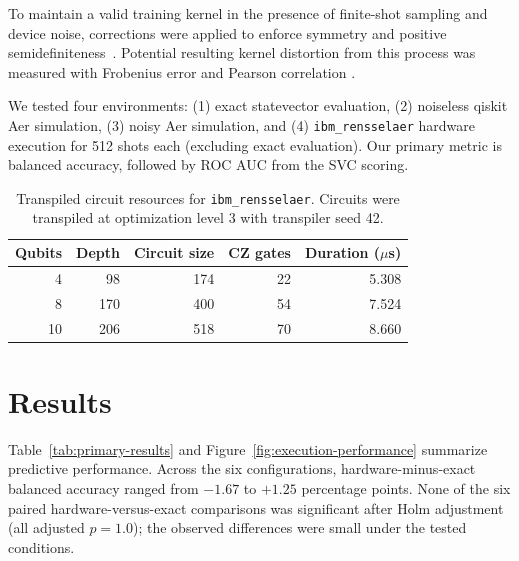 \documentclass[letterpaper]{article} %
\begin{document}
To maintain a valid training kernel in the presence of finite-shot sampling and device noise, corrections were applied to enforce symmetry and positive semidefiniteness~\cite{scholkopf2002,qiskit2024}.
Potential resulting kernel distortion from this process was measured with Frobenius error and Pearson correlation \cite{Frob, Pear}.

We tested four environments: (1) exact statevector evaluation, (2) noiseless qiskit Aer simulation, (3) noisy Aer simulation, and (4) \texttt{ibm\_rensselaer} hardware execution for 512 shots each (excluding exact evaluation). Our primary metric is balanced accuracy, followed by ROC AUC from the SVC scoring.



\begin{table}[t]
  \centering
  \small
  \caption{Transpiled circuit resources for \texttt{ibm\_rensselaer}.
  Circuits were transpiled at optimization level 3 with transpiler
  seed 42.}
  \label{tab:circuit-resources}
  \begin{tabular}{rrrrr}
  \toprule
  Qubits & Depth & Circuit size & CZ gates & Duration ($\mu$s) \\
  \midrule
  4  & 98  & 174 & 22 & 5.308 \\
  8  & 170 & 400 & 54 & 7.524 \\
  10 & 206 & 518 & 70 & 8.660 \\
  \bottomrule
  \end{tabular}
  \end{table}


\section{Results}

Table~\ref{tab:primary-results} and Figure~\ref{fig:execution-performance} summarize predictive performance. Across the six configurations, hardware-minus-exact balanced accuracy ranged from $-1.67$ to $+1.25$ percentage points. None of the six paired hardware-versus-exact comparisons was significant after Holm adjustment (all adjusted $p=1.0$); the observed differences were small under the tested conditions.
\end{document}
